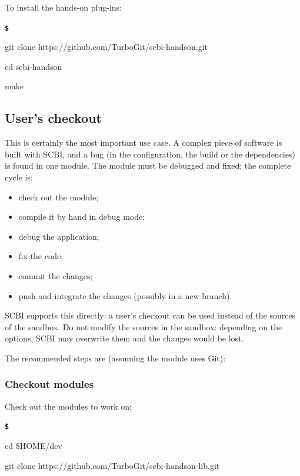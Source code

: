 \documentclass[a4paper,12pt,twoside]{article}
\newenvironment{shellcommand}{
	\begin{list}{ %
			\bfseries\texttt \$
		}{ %
			\ttfamily
			\setlength{\topsep}{-0.3ex}
			\setlength{\labelwidth}{1in}
			\setlength{\leftmargin}{0.7in}
			\setlength{\labelsep}{0.5ex}
			\setlength{\rightmargin}{0.5in}
			\setlength{\itemsep}{1ex}
			\setlength{\parsep}{0ex}
			\setlength{\listparindent}{0.5in}
		}
	}{
	\end{list}
}
\begin{document}
To install the hands-on plug-ins:

\begin{shellcommand}
	\item git clone https://github.com/TurboGit/scbi-handson.git
	\item cd scbi-handson
	\item make
\end{shellcommand}

\subsection{User's checkout}
\label{userco}

This is certainly the most important use case. A complex piece of software is built with SCBI, and a bug (in the configuration, the build or the dependencies) is found in one module. The module must be debugged and fixed; the complete cycle is:

\begin{itemize}
	\item check out the module;
	\item compile it by hand in debug mode;
	\item debug the application;
	\item fix the code;
	\item commit the changes;
	\item push and integrate the changes (possibly in a new branch).
\end{itemize}

SCBI supports this directly: a user's checkout can be used instead of the sources of the sandbox. Do not modify the sources in the sandbox: depending on the options, SCBI may overwrite them and the changes would be lost.

The recommended steps are (assuming the module uses Git):

\subsubsection{Checkout modules}

Check out the modules to work on:

\begin{shellcommand}
	\item cd \$HOME/dev
	\item git clone https://github.com/TurboGit/scbi-handson-lib.git
\end{shellcommand}
\end{document}
